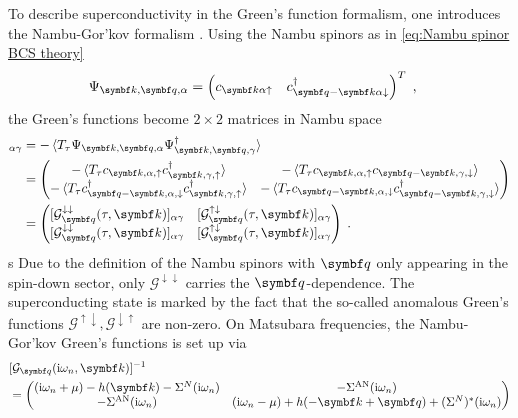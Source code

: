 \documentclass[../main.tex]{subfiles}
\begin{document}
To describe superconductivity in the Green's function formalism, one introduces the Nambu-Gor'kov formalism \cite{georgesDynamicalMeanfieldTheory1996}.
Using the Nambu spinors as in \cref{eq:Nambu spinor BCS theory}
\begin{align}
	\Psi_{\vb{k}, \vb{q}, \alpha} &= 
	\begin{pmatrix}
		c_{\vb{k} \alpha \uparrow} & 
		c_{\vb{q} -\vb{k} \alpha \downarrow}^{\dagger}
	\end{pmatrix}^{T} \;,
\end{align}
the Green's functions become \(2 \times 2\) matrices in Nambu space
\begin{align}
	[\mathcal{G}_{\vb{q}} (\tau, \vb{k})]_{\alpha \gamma} &= -\braket{T_{\tau} \Psi_{\vb{k}, \vb{q}, \alpha} \Psi_{\vb{k}, \vb{q}, \gamma}^{\dagger}} \\ 
	&= \begin{pmatrix}
		-\braket{T_{\tau} c_{\vb{k}, \alpha, \uparrow} c_{\vb{k}, \gamma, \uparrow}^{\dagger}} &
		-\braket{T_{\tau} c_{\vb{k}, \alpha, \uparrow} c_{\vb{q} - \vb{k}, \gamma, \downarrow}} \\
		-\braket{T_{\tau} c_{\vb{q} - \vb{k}, \alpha, \downarrow}^{\dagger} c_{\vb{k}, \gamma, \uparrow}^{\dagger}} &
		-\braket{T_{\tau} c_{\vb{q} - \vb{k}, \alpha, \downarrow} c_{\vb{q} - \vb{k}, \gamma, \downarrow}^{\dagger}}
	\end{pmatrix} \\
	&= \begin{pmatrix}
		[\mathcal{G}^{\downarrow \downarrow}_{\vb{q}} (\tau, \vb{k})]_{\alpha \gamma} & [\mathcal{G}^{\uparrow \downarrow}_{\vb{q}} (\tau, \vb{k})]_{\alpha \gamma} \\
		[\mathcal{G}^{\downarrow \downarrow}_{\vb{q}} (\tau, \vb{k})]_{\alpha \gamma} & [\mathcal{G}^{\uparrow \downarrow}_{\vb{q}} (\tau, \vb{k})]_{\alpha \gamma} \\
	\end{pmatrix} \;.
\end{align}
s
Due to the definition of the Nambu spinors with \(\vb{q}\) only appearing in the spin-down sector, only \(\mathcal{G}^{\downarrow \downarrow}\) carries the \(\vb{q}\)-dependence.
The superconducting state is marked by the fact that the so-called anomalous Green's functions \(\mathcal{G}^{\uparrow \downarrow}, \mathcal{G}^{\downarrow \uparrow}\) are non-zero.
On Matsubara frequencies, the Nambu-Gor'kov Green's functions is set up via
\begin{align}
	&[\mathcal{G}_{\vb{q}} (\iu \omega_n, \vb{k})]^{-1} \\
	&= \begin{pmatrix}
		(\iu \omega_n + \mu) - h (\vb{k}) - \Sigma^{N} (\iu \omega_n) & -\Sigma^{\mathrm{AN}} (\iu \omega_n) \\
		-\Sigma^{\mathrm{AN}} (\iu \omega_n) & (\iu \omega_n - \mu) + h (-\vb{k} + \vb{q}) + (\Sigma^{N})^* (\iu \omega_n) \nonumber
	\end{pmatrix}
\end{align}
\end{document}
